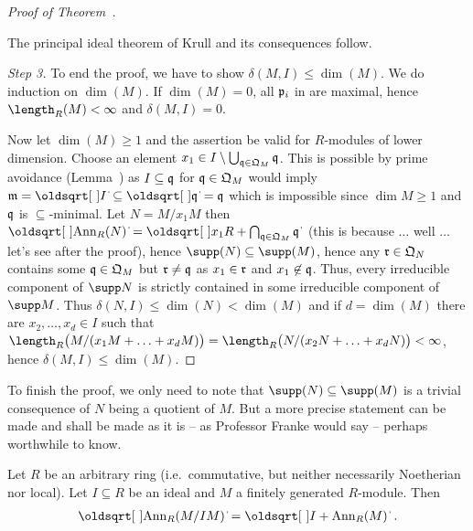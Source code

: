 \documentclass[a4paper,parskip=half,numbers=enddot, DIV=12, headheight=30pt]{scrreprt}
\begin{document}
\begin{proof}[Proof of Theorem~]
    \begin{cor*}[*facepalm*]
        The principal ideal theorem of Krull and its consequences follow.
    \end{cor*}
    
    \emph{Step 3.} To end the proof, we have to show $\delta(M,I) \leq \dim(M)$. We do induction on $\dim(M)$. If $\dim(M) = 0$, all $\mathfrak{p}_i$ in  are maximal, hence $\length_R(M) < \infty$ and $\delta(M,I) =0$. 
    
    Now let $\dim(M)\geq 1$ and the assertion be valid for $R$-modules of lower dimension. Choose an element $x_1 \in I  \setminus \bigcup_{\mathfrak{q}\in \mathfrak{Q}_M}\mathfrak{q}$. This is possible by prime avoidance (Lemma~) as $I\subseteq \mathfrak{q}$ for $\mathfrak{q}\in\mathfrak{Q}_M$ would imply $\mm = \sqrt{I}\subseteq \sqrt{\qq} = \qq$ which is impossible since $\dim M \geq 1$ and $\mathfrak{q}$ is $\subseteq$-minimal. Let $N= M/x_1 M$ then $\sqrt{\Ann_R(N)} = \sqrt{x_1R + \bigcap_{\qq\in \QQ_M}\qq}$ (this is because $\ldots$ well $\ldots$ let's see after the proof), hence $\supp(N) \subseteq \supp(M)$, hence any $\mathfrak{r}\in \mathfrak{Q}_N$ contains some $\mathfrak{q}\in \mathfrak{Q}_M$ but $\mathfrak{r} \neq \mathfrak{q}$ as $x_1\in \mathfrak{r}$ and $x_1\not \in \mathfrak{q}$. Thus, every irreducible component of $\supp N$ is strictly contained in some irreducible component of $\supp M$. Thus $\delta(N,I) \leq \dim (N) < \dim(M)$ and if $d=\dim(M)$ there are $x_2,\ldots, x_d\in I$ such that $\length_R\big(M/(x_1M+\ldots+x_dM)\big) = \length_R\big(N/(x_2N+\ldots+x_dN)\big) < \infty$, hence $\delta(M,I) \leq \dim(M)$.
\end{proof}
To finish the proof, we only need to note that $\supp(N)\subseteq \supp(M)$ is a trivial consequence of $N$ being a quotient of $M$. But a more precise statement can be made and shall be made as it is -- as Professor Franke would say -- perhaps worthwhile to know. %
\begin{lem}
	Let $R$ be an arbitrary ring (i.e.\ commutative, but neither necessarily Noetherian nor local). Let $I\subseteq R$ be an ideal and $M$ a finitely generated $R$-module. Then
	\begin{align*}
		\sqrt{\Ann_R(M/IM)}=\sqrt{I+\Ann_R(M)}\;.
	\end{align*}
\end{lem}
\end{document}
